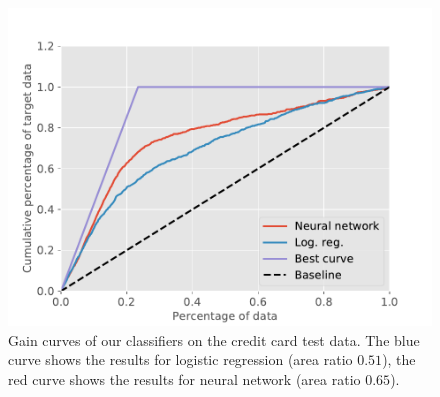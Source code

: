 \begin{figure}[!h]
    \centering
    \includegraphics[scale=0.6]{Figures/Classification/gain_chart.pdf}
    \caption{Gain curves of our classifiers on the credit card test data. The blue curve shows the results for logistic regression (area ratio $0.51$), the red curve shows the results for neural network (area ratio $0.65$).}
    \label{fig:gain_logreg_nn}
\end{figure}





